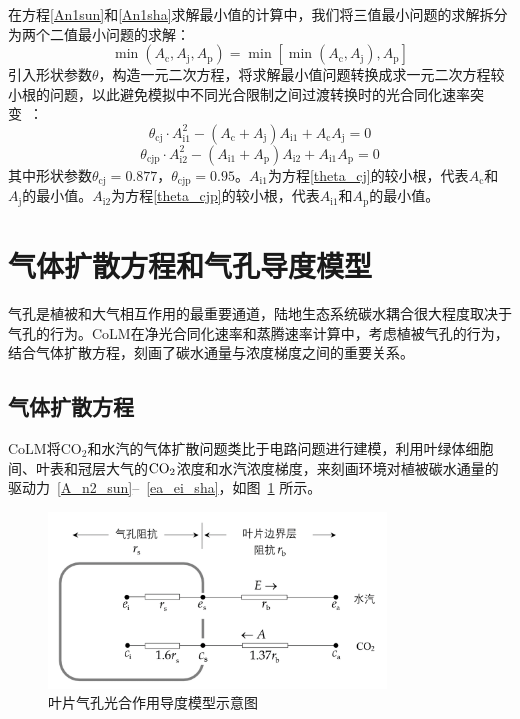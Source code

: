 在方程\eqref{An1sun}和\eqref{An1sha}求解最小值的计算中，我们将三值最小问题的求解拆分为两个二值最小问题的求解：
\begin{equation}\label{min_Ac_Aj_Ae}
\min \left(A_{\mathrm{c}}, A_{\mathrm{j}}, A_{\mathrm{p}}\right)
= \min \left[\min \left(A_{\mathrm{c}}, A_{\mathrm{j}}\right), A_{\mathrm{p}}\right]
\end{equation}
引入形状参数$\theta$，构造一元二次方程，将求解最小值问题转换成求一元二次方程较小根的问题，以此避免模拟中不同光合限制之间过渡转换时的光合同化速率突变~\citep{collatz1991,collatz1992}：
\begin{equation}\label{theta_cj}
\theta_{\mathrm{c j}} \cdot A_{\mathrm{i1}}^{2}-\left(A_{\mathrm{c}}+A_{\mathrm{j}}\right) A_{\mathrm{i1}}+A_{\mathrm{c}} A_{\mathrm{j}}=0
\end{equation}
\begin{equation}\label{theta_cjp}
\theta_{\mathrm{c j p}} \cdot A_{\mathrm{i2}}^{2}-\left(A_{\mathrm{i1}}+A_{\mathrm{p}}\right) A_{\mathrm{i2}}+A_{\mathrm{i1}} A_{\mathrm{p}}=0
\end{equation}
其中形状参数$\theta_{\mathrm{cj}}=0.877$，$\theta_{\mathrm{cjp}}=0.95$。$A_{\mathrm{i1}}$为方程\eqref{theta_cj}的较小根，代表$A_{\mathrm {c}}$和$A_{\mathrm {j}}$的最小值。$A_{\mathrm{i2}}$为方程\eqref{theta_cjp}的较小根，代表$A_{\mathrm{i1}}$和$A_{\mathrm {p}}$的最小值。


\section{气体扩散方程和气孔导度模型}\label{气体扩散方程和气孔导度模型}
气孔是植被和大气相互作用的最重要通道，陆地生态系统碳水耦合很大程度取决于气孔的行为。CoLM在净光合同化速率和蒸腾速率计算中，考虑植被气孔的行为，结合气体扩散方程，刻画了碳水通量与浓度梯度之间的重要关系。

\subsection{气体扩散方程}

CoLM将CO$_2$和水汽的气体扩散问题类比于电路问题进行建模，利用叶绿体细胞间、叶表和冠层大气的$\rm CO_2$浓度和水汽浓度梯度，来刻画环境对植被碳水通量的驱动力~\eqref{A_n2_sun}--~\eqref{ea_ei_sha}，如图~\ref{fig:叶片气孔光合作用导度模型示意图} 所示。
%
{
\begin{figure}[htbp]
\centering
\includegraphics[width=0.8\textwidth]{Figures/气孔导度和光合作用/叶片气孔光合作用导度模型示意图_v2.png}
\caption{叶片气孔光合作用导度模型示意图}
\label{fig:叶片气孔光合作用导度模型示意图}
\end{figure}
}

